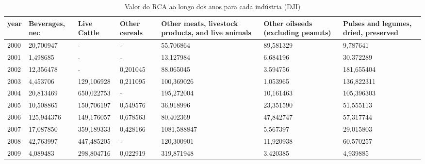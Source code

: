 \begin{table}
\centering
\caption{Valor do RCA ao longo dos anos para cada indústria (DJI)}
\begin{tabular}{p{1cm}p{2cm}p{2cm}p{2cm}p{2cm}p{2cm}p{2cm}}
\toprule
 year &  Beverages, nec &  Live Cattle &  Other cereals &  Other meats, livestock products, and live animals &  Other oilseeds (excluding peanuts) &  Pulses and legumes, dried, preserved \\
\midrule
 2000 &       20,700947 &            - &              - &                                          55,706864 &                           89,581329 &                              9,787641 \\
 2001 &        1,498685 &            - &              - &                                          13,127984 &                            6,684196 &                             30,372289 \\
 2002 &       12,356478 &            - &       0,201045 &                                          88,065045 &                            3,594756 &                            181,655404 \\
 2003 &        4,453706 &   129,106928 &       0,211095 &                                         100,369026 &                            1,053965 &                            136,822311 \\
 2004 &       20,813469 &   650,022753 &              - &                                         195,272004 &                           10,161463 &                            105,396303 \\
 2005 &       10,508865 &   150,706197 &       0,549576 &                                          36,918996 &                           23,351590 &                             51,555113 \\
 2006 &      125,944376 &   149,176057 &       0,678563 &                                          80,402369 &                           47,842747 &                             57,317744 \\
 2007 &       17,087850 &   359,189333 &       0,428166 &                                        1081,588847 &                            5,567397 &                             29,015803 \\
 2008 &       42,763997 &   447,485205 &              - &                                         120,300901 &                           11,920938 &                             60,570257 \\
 2009 &        4,089483 &   298,804716 &       0,022919 &                                         319,871948 &                            3,420385 &                              4,939885 \\

\end{tabular}
\end{table}
